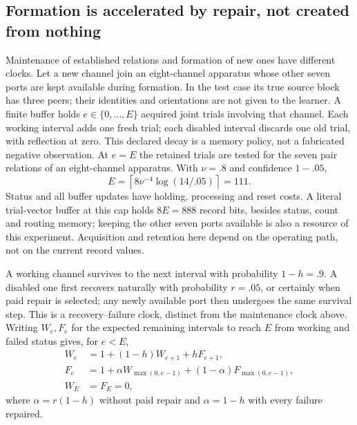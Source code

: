 \documentclass[11pt]{article}
\theoremstyle{definition}
\theoremstyle{remark}
\begin{document}
\subsection{Formation is accelerated by repair, not created from nothing}
\label{subsec:formation_clock}

Maintenance of established relations and formation of new ones have
different clocks. Let a new channel join an eight-channel apparatus
whose other seven ports are kept available during formation.
In the test case its true source block has three peers; their
identities and orientations are not given to the learner.
A finite buffer holds $e\in\{0,\ldots,E\}$ acquired joint trials
involving that channel. Each working interval adds one fresh trial;
each disabled interval discards one old trial, with reflection at
zero. This declared decay is a memory policy, not a fabricated
negative observation. At $e=E$ the retained trials are tested for
the seven pair relations of an eight-channel apparatus.
With $\nu=.8$ and confidence $1-.05$,
\[
 E=\left\lceil8\nu^{-4}\log(14/.05)\right\rceil=111.
\]
Status and all buffer updates have holding, processing and reset
costs. A literal trial-vector buffer at this cap holds $8E=888$
record bits, besides status, count and routing memory; keeping the
other seven ports available is also a resource of this experiment.
Acquisition and retention here depend on the operating path,
not on the current record values.

A working channel survives to the next interval with probability
$1-h=.9$. A disabled one first recovers naturally with probability
$r=.05$, or certainly when paid repair is selected; any newly
available port then undergoes the same survival step. This is a
recovery--failure clock, distinct from the maintenance clock above.
Writing $W_e,F_e$ for the expected remaining intervals to reach
$E$ from working and failed status gives, for $e<E$,
\begin{equation}\label{eq:formation_clock}
 \begin{split}
 W_e&=1+(1-h)W_{e+1}+hF_{e+1},\\
 F_e&=1+\alpha W_{\max(0,e-1)}
           +(1-\alpha)F_{\max(0,e-1)},\\
 W_E&=F_E=0,
 \end{split}
\end{equation}
where $\alpha=r(1-h)$ without paid repair and $\alpha=1-h$
with every failure repaired.
\end{document}
